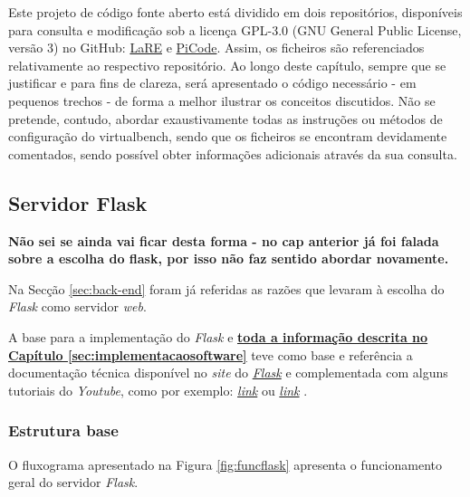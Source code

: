 Este projeto de código fonte aberto está dividido em dois repositórios, disponíveis para consulta e modificação sob a licença GPL-3.0 (GNU General Public License, versão 3) no GitHub: \href{https://github.com/eddygrinder/LaRE}{LaRE} e \href{https://github.com/eddygrinder/LaRE_PICode}{PiCode}. Assim, os ficheiros são referenciados relativamente ao respectivo repositório. Ao longo deste capítulo, sempre que se justificar e para fins de clareza, será apresentado o código necessário - em pequenos trechos - de forma a melhor ilustrar os conceitos discutidos. Não se pretende, contudo, abordar exaustivamente todas as instruções ou métodos de configuração do \acrshort{virtualbench}, sendo que os ficheiros se encontram devidamente comentados, sendo possível obter informações adicionais através da sua consulta. 

\subsection{Servidor Flask}
\label{sec:flask}
\textbf{Não sei se ainda vai ficar desta forma - no cap anterior já foi falada sobre a escolha do flask, por isso não faz sentido abordar novamente.}

Na Secção \ref{sec:back-end} foram já referidas as razões que levaram à escolha do \textit{Flask} como servidor \textit{web}. 

A base para a implementação do \textit{Flask} e \underline{\textbf{toda a informação descrita no}} \underline{\textbf{Capítulo \ref{sec:implementacaosoftware}}} teve como base e referência a documentação técnica disponível no \textit{site} do \href{https://flask.palletsprojects.com/en/3.0.x/}{\textit{Flask}} e complementada com alguns tutoriais do \textit{Youtube}, como por exemplo: \href{https://www.youtube.com/watch?v=dam0GPOAvVI}{\textit{link}} ou \href{https://www.youtube.com/watch?v=bB6Yyh7nUl4}{\textit{link}} .

\subsubsection{Estrutura base}
O fluxograma apresentado na Figura \ref{fig:funcflask} apresenta o funcionamento geral do servidor \textit{Flask}.

